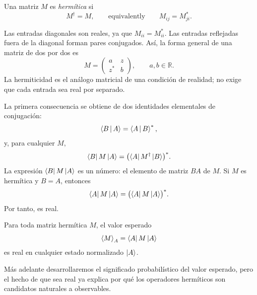 \begin{definition}
Una matriz \(M\) es \emph{hermítica} si
\begin{equation}
  M^\dagger=M,
  \qquad\text{equivalently}\qquad
  M_{ij}=M_{ji}^*.
  \label{eq:l03-hermitian}
\end{equation}
\end{definition}

Las entradas diagonales son reales, ya que \(M_{ii}=M_{ii}^*\). Las entradas reflejadas fuera de la diagonal forman pares conjugados. Así, la forma general de una matriz de dos por dos es
\begin{equation}
  M=
  \begin{pmatrix}
    a&z\\
    z^*&b
  \end{pmatrix},
  \qquad a,b\in\mathbb R.
  \label{eq:l03-hermitian-two}
\end{equation}
La hermiticidad es el análogo matricial de una condición de realidad; no exige que cada entrada sea real por separado.

La primera consecuencia se obtiene de dos identidades elementales de conjugación:
\begin{equation}
  \left\langle B\,\middle|\,A\right\rangle=\left\langle A\,\middle|\,B\right\rangle^*,
  \label{eq:l03-inner-conjugation}
\end{equation}
y, para cualquier \(M\),
\begin{equation}
  \left\langle B\right\rvert M\left\lvert A\right\rangle
  =
  \bigl(\left\langle A\right\rvert M^\dagger\left\lvert B\right\rangle\bigr)^*.
  \label{eq:l03-matrix-element-conjugation}
\end{equation}
La expresión \(\left\langle B\right\rvert M\left\lvert A\right\rangle\) es un número: el elemento de matriz \(BA\) de \(M\). Si \(M\) es hermítica y \(B=A\), entonces
\begin{equation}
  \left\langle A\right\rvert M\left\lvert A\right\rangle
  =
  \bigl(\left\langle A\right\rvert M\left\lvert A\right\rangle\bigr)^*.
\end{equation}
Por tanto, es real.

\begin{proposition}
Para toda matriz hermítica \(M\), el valor esperado
\begin{equation}
  \left\langle M\right\rangle_A=\left\langle A\right\rvert M\left\lvert A\right\rangle
  \label{eq:l03-expectation}
\end{equation}
es real en cualquier estado normalizado \(\left\lvert A\right\rangle\).
\end{proposition}

Más adelante desarrollaremos el significado probabilístico del valor esperado, pero el hecho de que sea real ya explica por qué los operadores hermíticos son candidatos naturales a observables.

